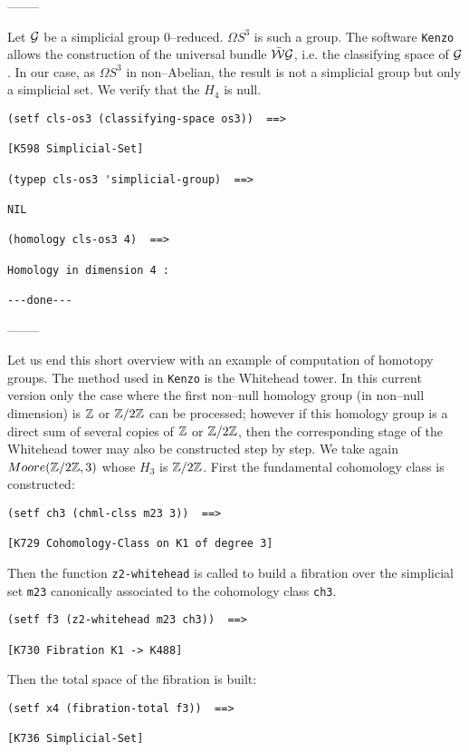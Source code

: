 \begin{center}
--------
\end{center}
Let ${\cal G}$ be a simplicial group $0$--reduced. $\Omega S^3$ is such a group.
The software  {\tt Kenzo} allows
the construction of the universal bundle $\bar{\cal W}{\cal G}$, i.e. the
classifying space of ${\cal G}$. In our case, as $\Omega S^3$ in non--Abelian, the
result is not a simplicial group but only a simplicial set. We verify that the $H_4$ is null.
{\footnotesize\begin{verbatim}
(setf cls-os3 (classifying-space os3))  ==>

[K598 Simplicial-Set]

(typep cls-os3 'simplicial-group)  ==>

NIL

(homology cls-os3 4)  ==>

Homology in dimension 4 :

---done---
\end{verbatim}}
\begin{center}
--------
\end{center}
\vskip 0.40cm
Let us end this short overview with an example of computation of homotopy groups.
The method used in {\tt Kenzo} is the Whitehead tower.
In this current version only the case where the first non--null
homology group (in non--null dimension) is ${\mathbb{Z}}$ or ${\mathbb{Z}}/{2 {\mathbb{Z}}}$ can be processed; however if this
homology group is a direct sum of several copies of ${\mathbb{Z}}$ or ${\mathbb{Z}}/{2 {\mathbb{Z}}}$, then the corresponding
stage of the Whitehead tower may also be constructed step by step.
\vskip 0.40cm
We take again $Moore({\mathbb{Z}}/2{\mathbb{Z}}, 3)$ whose $H_3$ is ${\mathbb{Z}}/2{\mathbb{Z}}$. First the fundamental cohomology
class is constructed:
{\footnotesize\begin{verbatim}
(setf ch3 (chml-clss m23 3))  ==>

[K729 Cohomology-Class on K1 of degree 3]
\end{verbatim}}
Then the function {\tt z2-whitehead} is called to build a fibration over the simplicial set {\tt m23}
canonically associated to the cohomology class {\tt ch3}.
{\footnotesize\begin{verbatim}
(setf f3 (z2-whitehead m23 ch3))  ==>

[K730 Fibration K1 -> K488]
\end{verbatim}}
Then the total space of the fibration is built:
{\footnotesize\begin{verbatim}
(setf x4 (fibration-total f3))  ==>

[K736 Simplicial-Set]
\end{verbatim}}
